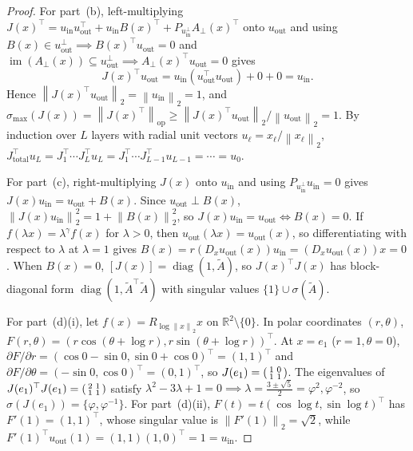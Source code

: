 \documentclass[10pt]{article}
\theoremstyle{definition}
\theoremstyle{remark}
\newcommand{\R}{\mathbb{R}}
\newcommand{\norm}[1]{\left\lVert #1 \right\rVert}
\DeclareMathOperator{\diag}{diag}
\begin{document}
\begin{proof}
For part~(b), left-multiplying $J(x)^\top = u_{\mathrm{in}} u_{\mathrm{out}}^\top + u_{\mathrm{in}} B(x)^\top + P_{u_{\mathrm{in}}^\perp} A_\perp(x)^\top$ onto $u_{\mathrm{out}}$ and using $B(x) \in u_{\mathrm{out}}^\perp \implies B(x)^\top u_{\mathrm{out}} = 0$ and $\operatorname{im}(A_\perp(x)) \subseteq u_{\mathrm{out}}^\perp \implies A_\perp(x)^\top u_{\mathrm{out}} = 0$ gives
\begin{equation}
    J(x)^\top u_{\mathrm{out}} = u_{\mathrm{in}} (u_{\mathrm{out}}^\top u_{\mathrm{out}}) + 0 + 0 = u_{\mathrm{in}}.
\end{equation}
Hence $\norm{J(x)^\top u_{\mathrm{out}}}_2 = \norm{u_{\mathrm{in}}}_2 = 1$, and $\sigma_{\max}(J(x)) = \norm{J(x)^\top}_{\mathrm{op}} \ge \norm{J(x)^\top u_{\mathrm{out}}}_2 / \norm{u_{\mathrm{out}}}_2 = 1$. By induction over $L$ layers with radial unit vectors $u_\ell = x_\ell / \norm{x_\ell}_2$, $J_{\mathrm{total}}^\top u_L = J_1^\top \cdots J_L^\top u_L = J_1^\top \cdots J_{L-1}^\top u_{L-1} = \cdots = u_0$.

For part~(c), right-multiplying $J(x)$ onto $u_{\mathrm{in}}$ and using $P_{u_{\mathrm{in}}^\perp} u_{\mathrm{in}} = 0$ gives $J(x) u_{\mathrm{in}} = u_{\mathrm{out}} + B(x)$. Since $u_{\mathrm{out}} \perp B(x)$, $\norm{J(x) u_{\mathrm{in}}}_2^2 = 1 + \norm{B(x)}_2^2$, so $J(x) u_{\mathrm{in}} = u_{\mathrm{out}} \iff B(x) = 0$. If $f(\lambda x) = \lambda^\gamma f(x)$ for $\lambda > 0$, then $u_{\mathrm{out}}(\lambda x) = u_{\mathrm{out}}(x)$, so differentiating with respect to $\lambda$ at $\lambda = 1$ gives $B(x) = r (D_x u_{\mathrm{out}}(x)) u_{\mathrm{in}} = (D_x u_{\mathrm{out}}(x)) x = 0$. When $B(x) = 0$, $[J(x)] = \diag(1, \tilde{A})$, so $J(x)^\top J(x)$ has block-diagonal form $\diag(1, \tilde{A}^\top \tilde{A})$ with singular values $\{1\} \cup \sigma(\tilde{A})$.

For part~(d)(i), let $f(x) = R_{\log \norm{x}_2} x$ on $\R^2 \setminus \{0\}$. In polar coordinates $(r, \theta)$, $F(r, \theta) = (r \cos(\theta + \log r), r \sin(\theta + \log r))^\top$. At $x = e_1$ ($r = 1, \theta = 0$), $\partial F / \partial r = (\cos 0 - \sin 0, \sin 0 + \cos 0)^\top = (1, 1)^\top$ and $\partial F / \partial \theta = (-\sin 0, \cos 0)^\top = (0, 1)^\top$, so $J(e_1) = \begin{psmallmatrix} 1 & 0 \\ 1 & 1 \end{psmallmatrix}$. The eigenvalues of $J(e_1)^\top J(e_1) = \begin{psmallmatrix} 2 & 1 \\ 1 & 1 \end{psmallmatrix}$ satisfy $\lambda^2 - 3\lambda + 1 = 0 \implies \lambda = \frac{3 \pm \sqrt{5}}{2} = \varphi^2, \varphi^{-2}$, so $\sigma(J(e_1)) = \{\varphi, \varphi^{-1}\}$. For part~(d)(ii), $F(t) = t(\cos \log t, \sin \log t)^\top$ has $F'(1) = (1, 1)^\top$, whose singular value is $\norm{F'(1)}_2 = \sqrt{2}$, while $F'(1)^\top u_{\mathrm{out}}(1) = (1, 1)(1, 0)^\top = 1 = u_{\mathrm{in}}$.
\end{proof}
\end{document}
